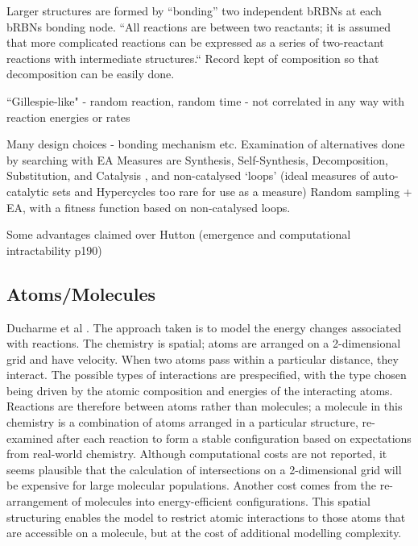 Larger structures are formed by ``bonding'' two independent bRBNs at each bRBNs bonding node. ``All reactions are between two reactants; it is assumed that more complicated reactions can be expressed as a series of two-reactant reactions with intermediate structures.`` Record kept of composition so that decomposition can be easily done.

``Gillespie-like" - random reaction, random time - not correlated in any way with reaction energies or rates \parencite[chap.8]{Faulconbridge2011}

Many design choices - bonding mechanism etc. Examination of alternatives done by searching with EA
Measures are Synthesis, Self-Synthesis, Decomposition, Substitution, and Catalysis \parencite[chap.7]{Faulconbridge2011}, and non-catalysed `loops' (ideal measures of auto-catalytic sets and Hypercycles too rare for use as a measure) \parencite[chap.8]{Faulconbridge2011}
Random sampling + EA, with a fitness function based on non-catalysed loops.

Some advantages claimed over Hutton (emergence and computational intractability p190)

\subsection{Atoms/Molecules}

Ducharme et al \parencite{Ducharme2012}. The approach taken is to model the energy changes associated with reactions. The chemistry is spatial; atoms are arranged on a 2-dimensional grid and have velocity. When two atoms pass within a particular distance, they interact. The possible types of interactions are prespecified, with the type chosen being driven by the atomic composition and energies of the interacting atoms. Reactions are therefore between atoms rather than molecules; a molecule in this chemistry is a combination of atoms arranged in a particular structure, re-examined after each reaction to form a stable configuration based on expectations from real-world chemistry. Although computational costs are not reported, it seems plausible that the calculation of intersections on a 2-dimensional grid will be expensive for large molecular populations. Another cost comes from the re-arrangement of molecules into energy-efficient configurations. This spatial structuring enables the model to restrict atomic interactions to those atoms that are accessible on a molecule, but at the cost of additional modelling complexity. 

